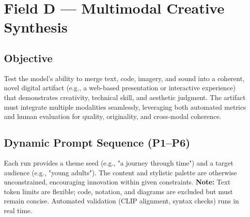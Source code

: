\section{Field D — Multimodal Creative Synthesis}
\label{sec:fieldD}

\subsection*{Objective}
Test the model's ability to merge text, code, imagery, and sound into a coherent, novel digital artifact (e.g., a web-based presentation or interactive experience) that demonstrates creativity, technical skill, and aesthetic judgment. The artifact must integrate multiple modalities seamlessly, leveraging both automated metrics and human evaluation for quality, originality, and cross-modal coherence.

\subsection*{Dynamic Prompt Sequence (P1–P6)}
Each run provides a theme seed (e.g., "a journey through time") and a target audience (e.g., "young adults"). The content and stylistic palette are otherwise unconstrained, encouraging innovation within given constraints.  
\textbf{Note:} Text token limits are flexible; code, notation, and diagrams are excluded but must remain concise. Automated validation (CLIP alignment, syntax checks) runs in real time.

